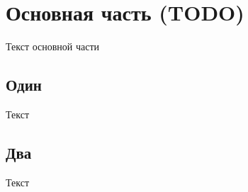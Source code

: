 \newpage

\section{Основная часть (TODO)}

Текст основной части

\subsection{Один}
Текст
\subsection{Два}
Текст

\clearpage